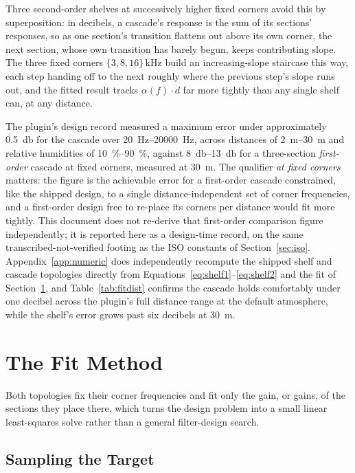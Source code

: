 \documentclass[11pt,a4paper]{article}
\begin{document}
Three second-order shelves at successively higher fixed corners avoid this by superposition: in decibels, a cascade's response is the sum of its sections' responses, so as one section's transition flattens out above its own corner, the next section, whose own transition has barely begun, keeps contributing slope.
The three fixed corners $\{3, 8, 16\}\,\si{\kilo\hertz}$ build an increasing-slope staircase this way, each step handing off to the next roughly where the previous step's slope runs out, and the fitted result tracks $\alpha(f)\cdot d$ far more tightly than any single shelf can, at any distance.

The plugin's design record measured a maximum error under approximately \SI{0.5}{\decibel} for the cascade over \SIrange{20}{20000}{\hertz}, across distances of \SIrange{2}{30}{\meter} and relative humidities of \SIrange{10}{90}{\percent}, against \SIrange{8}{13}{\decibel} for a three-section \emph{first-order} cascade at fixed corners, measured at \SI{30}{\meter}.
The qualifier \emph{at fixed corners} matters: the figure is the achievable error for a first-order cascade constrained, like the shipped design, to a single distance-independent set of corner frequencies, and a first-order design free to re-place its corners per distance would fit more tightly.
This document does not re-derive that first-order comparison figure independently; it is reported here as a design-time record, on the same transcribed-not-verified footing as the ISO constants of Section~\ref{sec:iso}.
Appendix~\ref{app:numeric} does independently recompute the shipped shelf and cascade topologies directly from Equations~\eqref{eq:shelf1}--\eqref{eq:shelf2} and the fit of Section~\ref{sec:fit}, and Table~\ref{tab:fitdist} confirms the cascade holds comfortably under one decibel across the plugin's full distance range at the default atmosphere, while the shelf's error grows past six decibels at \SI{30}{\meter}.

\section{The Fit Method}
\label{sec:fit}

Both topologies fix their corner frequencies and fit only the gain, or gains, of the sections they place there, which turns the design problem into a small linear least-squares solve rather than a general filter-design search.

\subsection{Sampling the Target}
\end{document}
